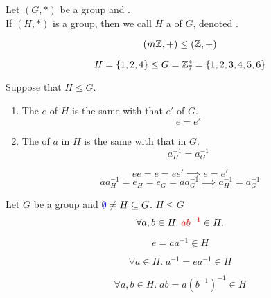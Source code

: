 
\begin{frame}
  \begin{definition}[Subgroup (子群)]
    Let $(G, \ast)$ be a group and . \\[6pt]
    If $(H, \ast)$ is a group, then
    we call $H$ a  of $G$, denoted .
  \end{definition}


\end{frame}

\begin{frame}
  \[
    (m\mathbb{Z}, +) \le (\mathbb{Z}, +)
  \]

  \pause
  \[
    H = \{1, 2, 4\} \le G = \mathbb{Z}^{\ast}_{7} = \{1, 2, 3, 4, 5, 6\}
  \]
\end{frame}

\begin{frame}
  \begin{theorem}
    Suppose that $H \le G$.
    \begin{enumerate}[(1)]
      \item The  $e$ of $H$ is the same with that $e'$ of $G$.
        \[
          e = e'
        \]
      \item The  of $a$ in $H$ is the same with that in $G$.
        \[
          a^{-1}_{H} = a^{-1}_{G}
        \]
    \end{enumerate}
  \end{theorem}

  \pause
  \[
    e e = e = e e' \implies e = e'
  \]
  \pause
  \[
    a a^{-1}_{H} = e_{H} = e_{G} = a a^{-1}_{G} \implies a^{-1}_{H} = a^{-1}_{G}
  \]
\end{frame}

\begin{frame}
  \begin{theorem}
    Let $G$ be a group and $\textcolor{blue}{\emptyset} \neq H \subseteq G$.
    $H \le G$ 
    \[
      \forall a, b \in H.\; \textcolor{red}{a b^{-1}} \in H.
    \]
  \end{theorem}

  \pause
  \[
    e = a a^{-1} \in H
  \]

  \pause
  \[
    \forall a \in H.\; a^{-1} = e a^{-1} \in H
  \]

  \pause
  \[
    \forall a, b \in H.\; ab = a(b^{-1})^{-1} \in H
  \]
\end{frame}

